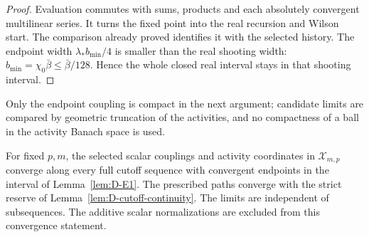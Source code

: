 \begin{proof}
Evaluation commutes with sums, products and each absolutely convergent multilinear series. It turns the fixed point into the real recursion and Wilson start. The comparison already proved identifies it with the selected history. The endpoint width $\lambda_*b_{\min}/4$ is smaller than the real shooting width: $b_{\min}=\chi_0\bar\beta\le\bar\beta/128$. Hence the whole closed real interval stays in that shooting interval.
\end{proof}

Only the endpoint coupling is compact in the next argument; candidate limits are compared by geometric truncation of the activities, and no compactness of a ball in the activity Banach space is used.
\begin{lemma}\label{lem:D-fixed-level}
For fixed $p,m$, the selected scalar couplings and activity coordinates in $\mathcal X_{m,p}$ converge along every full cutoff sequence with convergent endpoints in the interval of Lemma~\ref{lem:D-E1}. The prescribed paths converge with the strict reserve of Lemma~\ref{lem:D-cutoff-continuity}. The limits are independent of subsequences. The additive scalar normalizations are excluded from this convergence statement.
\end{lemma}
